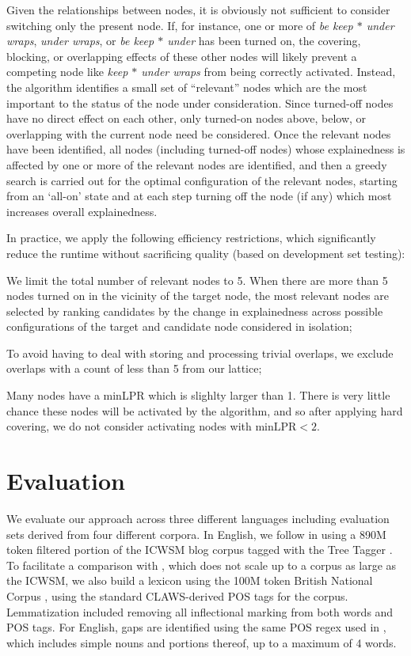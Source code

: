 \documentclass[11pt,letterpaper]{article}
\newcommand{\gap}{$*$\xspace}
\newcommand{\ex}[1]{\textit{#1}\xspace}
\newcommand{\minLPR}{\ensuremath{\text{minLPR}}}
\begin{document}
Given the relationships between nodes, it is obviously not sufficient to consider switching only the present node. If, for instance, one or more of \ex{be keep \gap under wraps}, \ex{under wraps}, or \ex{be keep \gap under} has been turned on, the covering, blocking, or overlapping effects of these other nodes will likely prevent a competing node like \ex{keep \gap under wraps} from being correctly activated. Instead, the algorithm identifies a small set of ``relevant'' nodes which are the most important to the status of the node under consideration. Since turned-off nodes have no direct effect on each other, only turned-on nodes above, below, or overlapping with the current node need be considered.  Once the relevant nodes have been identified, all nodes (including turned-off nodes) whose explainedness is affected by one or more of the relevant nodes are identified, and then a greedy search is carried out for the optimal configuration of the relevant nodes, starting from an `all-on' state and at each step turning off the node (if any) which most increases overall explainedness.

In practice, we apply the following efficiency restrictions, which significantly reduce the runtime without sacrificing quality (based on development set testing):
\begin{compactitem}
\item We limit the total number of relevant nodes to 5. When there are more than 5 nodes turned on in the vicinity of the target node, the most relevant nodes are selected by ranking candidates by the change in explainedness across possible configurations of the target and candidate node considered in isolation;
\item To avoid having to deal with storing and processing trivial overlaps, we exclude overlaps with a count of less than 5 from our lattice;
\item Many nodes have a minLPR which is slighlty larger than 1. There is very little chance these nodes will be activated by the algorithm, and so after applying hard covering, we do not consider activating nodes with $\minLPR < 2$.
\end{compactitem}

\section{Evaluation}
\label{sec:evaluation}

We evaluate our approach across three different languages including evaluation sets derived from four different corpora. In English, we follow  in using a 890M token filtered portion of the ICWSM blog corpus \cite{ICWSM} tagged with the Tree Tagger \cite{Schmid95}. To facilitate a comparison with , which does not scale up to a corpus as large as the ICWSM, we also build a lexicon using the 100M token British National Corpus \cite{BNC}, using the standard CLAWS-derived POS tags for the corpus. Lemmatization included removing all inflectional marking from both words and POS tags. For English, gaps are identified using the same POS regex used in , which includes simple nouns and portions thereof, up to a maximum of 4 words.
\end{document}
